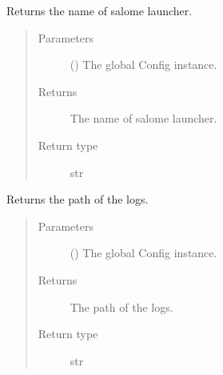 \documentclass[a4paper,10pt,english]{sphinxmanual}
\begin{document}

\begin{fulllineitems}
\label{\detokenize{commands/apidoc/src:src.__init__.get_launcher_name}}
Returns the name of salome launcher.
\begin{quote}\begin{description}
\item[{Parameters}] \leavevmode
{} () \textendash{} The global Config instance.

\item[{Returns}] \leavevmode
The name of salome launcher.

\item[{Return type}] \leavevmode
str

\end{description}\end{quote}

\end{fulllineitems}


\begin{fulllineitems}
\label{\detokenize{commands/apidoc/src:src.__init__.get_log_path}}
Returns the path of the logs.
\begin{quote}\begin{description}
\item[{Parameters}] \leavevmode
{} () \textendash{} The global Config instance.

\item[{Returns}] \leavevmode
The path of the logs.

\item[{Return type}] \leavevmode
str

\end{description}\end{quote}

\end{fulllineitems}

\end{document}
